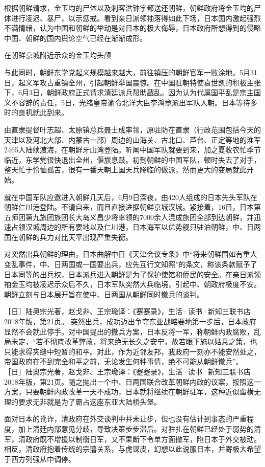 \documentclass[12pt,UTF8]{ctexbook}
\begin{document}
根据朝鲜请求，金玉均的尸体以及刺客洪钟宇都送还朝鲜，朝鲜政府将金玉均的尸体进行凌迟、暴尸，以示惩戒。看到亲日派领袖落得如此下场，日本国内激起强烈不满情绪，认为中国和朝鲜的举动是对日本的极大侮辱，日本政府所想得到的侵略中国、朝鲜的国内舆论空气已经在渐渐成形。


在朝鲜京城附近示众的金玉均头颅

与此同时，朝鲜东学党起义规模越来越大，前往镇压的朝鲜官军一败涂地。5月31日，起义军攻占重镇全州，引起朝鲜举国震惊。在中国驻朝特使袁世凯的积极主张下，6月3日，朝鲜政府正式请求清廷派兵帮助戡乱。因为认为代属国平乱是宗主国义不容辞的责任，5日，光绪皇帝谕令北洋大臣李鸿章派出军队入朝。日本等待多时的良机就此到来。

由直隶提督叶志超、太原镇总兵聂士成率领，原驻防在直隶（行政范围包括今天的天津以及河北大部、内蒙古一部）周边的山海关、古北口、芦台、正定等地的淮军2465人陆续渡海，在朝鲜牙山湾登陆。听闻中国军队就要到来，加之夏收农忙季节临近，东学党很快退出全州，偃旗息鼓。初到朝鲜的中国军队，顿时失去了对手，整天忙于怜恤孤苦，很有一番天朝上国天兵降临的做派，然而更大的变局就此开始。

就在中国军队应邀进入朝鲜几天后，6月9日深夜，由420人组成的日本先头军队在朝鲜仁川港登陆。不请自来，而且直接进据朝鲜京城汉城。紧接着，16日，日本第五师团第九旅团旅团长大岛义昌少将率领的7000余人混成旅团全部到达朝鲜，并迅速占领汉城周边的所有要地以及仁川港，日本海军以优势舰只驻泊朝鲜，中、日两国在朝鲜的兵力对比天平出现严重失衡。

对突然出兵朝鲜的理由，日本曲解中日《天津会议专条》中“将来朝鲜国如有重大变乱事件，中、日两国或一国要出兵，应先互行文知照”的条文，称该条款赋予了日本同等的出兵权，日本派兵进入朝鲜是为了保护使馆和侨民的安全。在亲日派领袖金玉均被凌迟示众后不久，日本军队突然大兵临境，引起中、朝政府极度不安。朝鲜立刻与日本展开旨在使中、日两国从朝鲜同时撤兵的谈判。

［日］陆奥宗光著，赵戈非、王宗瑜译：《蹇蹇录》，生活·读书·新知三联书店2018年版，第21页。
突然出兵，成功迈出争夺东亚战略要地第一步后，日本政府显然不会就此停手。对中国提出的撤兵方案，日本反将一军，称朝鲜内政腐败，乱局未定，“若不彻底改革弊政，将来绝无长久之安宁，故若眼下施以姑息之策，也只能求得夹缝中短暂的和平。对此，作为近邻友邦，我政府一刻亦不能安然处之，帝国政府在不到完全和平之前，无论发生何种事情，绝不可能从朝鲜撤兵”。 ［日］陆奥宗光著，赵戈非、王宗瑜译：《蹇蹇录》，生活·读书·新知三联书店2018年版，第21页。随之抛出一个中、日两国联合改革朝鲜内政的议案，按照这一方案，只要朝鲜内政改革一天不成功，日本就将继续在朝鲜驻军，这种近似蛮横无理的要求无非就是为了霸占这座东亚大陆桥头堡。

面对日本的讹诈，清政府在外交谈判中并未让步，但也没有估计到事态的严重程度，加上清廷内部意见分歧，导致决策步步滞后。对驻扎在朝鲜已经处于弱势的清军，清政府既不增援以制衡日军，又不果断下令单方面撤军，陷日本于外交被动。相反，清政府抱着传统的宗藩关系，与虎谋皮，幻想以此说服日本，并寄极大希望于西方列强从中调停。
\end{document}
